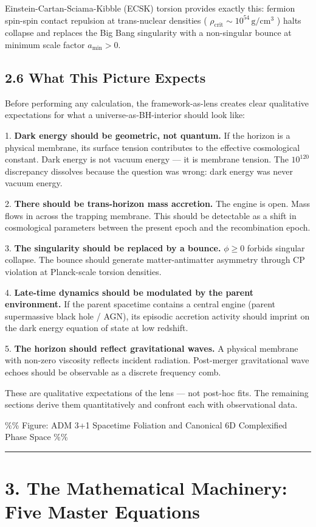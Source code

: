 \documentclass[11pt,a4paper]{article}
\theoremstyle{definition}\newtheorem{definition}{Definition}
\theoremstyle{remark}\newtheorem{remark}{Remark}
\begin{document}
Einstein-Cartan-Sciama-Kibble (ECSK) torsion provides exactly this: fermion spin-spin contact repulsion at trans-nuclear densities ( $\rho_{\text{crit}} \sim 10^{54}\,\mathrm{g/cm^3}$ ) halts collapse and replaces the Big Bang singularity with a non-singular bounce at minimum scale factor $a_{\text{min}} > 0$.
\subsection{2.6 What This Picture Expects}

Before performing any calculation, the framework-as-lens creates clear qualitative expectations for what a universe-as-BH-interior should look like:

1. \textbf{Dark energy should be geometric, not quantum.} If the horizon is a physical membrane, its surface tension contributes to the effective cosmological constant. Dark energy is not vacuum energy — it is membrane tension. The $10^{120}$ discrepancy dissolves because the question was wrong: dark energy was never vacuum energy.

2. \textbf{There should be trans-horizon mass accretion.} The engine is open. Mass flows in across the trapping membrane. This should be detectable as a shift in cosmological parameters between the present epoch and the recombination epoch.

3. \textbf{The singularity should be replaced by a bounce.} $\phi \ge 0$ forbids singular collapse. The bounce should generate matter-antimatter asymmetry through CP violation at Planck-scale torsion densities.

4. \textbf{Late-time dynamics should be modulated by the parent environment.} If the parent spacetime contains a central engine (parent supermassive black hole / AGN), its episodic accretion activity should imprint on the dark energy equation of state at low redshift.

5. \textbf{The horizon should reflect gravitational waves.} A physical membrane with non-zero viscosity reflects incident radiation. Post-merger gravitational wave echoes should be observable as a discrete frequency comb.

These are qualitative expectations of the lens — not post-hoc fits. The remaining sections derive them quantitatively and confront each with observational data.

\%\% Figure: ADM 3+1 Spacetime Foliation and Canonical 6D Complexified Phase Space \%\%

\noindent\rule{\linewidth}{0.4pt}
\section{3. The Mathematical Machinery: Five Master Equations}
\end{document}

